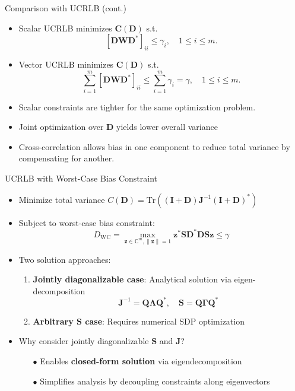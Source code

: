 \documentclass{beamer}
\begin{document}
\begin{frame}{Comparison with UCRLB (cont.)}
\begin{itemize}
    \item Scalar UCRLB minimizes $\mathbf{C}(\mathbf{D})$ s.t. 
    \[[\mathbf{D}\mathbf{W}\mathbf{D}^*]_{ii} \leq \gamma_i, \quad 1 \leq i \leq m.\]
    \item Vector UCRLB minimizes $\mathbf{C}(\mathbf{D})$ s.t. 
    \[\sum_{i=1}^m[\mathbf{D}\mathbf{W}\mathbf{D}^*]_{ii} \leq \sum_{i=1}^m\gamma_i = \gamma, 
    \quad 1 \leq i \leq m.\]
    \item Scalar constraints are tighter for the same optimization problem.
    \item Joint optimization over \( \mathbf{D} \) yields lower overall variance
    \item Cross-correlation allows bias in one component to reduce total variance by compensating for another.
\end{itemize}
\end{frame}

\begin{frame}{UCRLB with Worst-Case Bias Constraint}
\begin{itemize}
\item Minimize total variance $C(\mathbf{D}) = \text{Tr}((\mathbf{I}+\mathbf{D})\mathbf{J}^{-1}(\mathbf{I}+\mathbf{D})^*)$
\item Subject to worst-case bias constraint:
\[ D_{\text{WC}} = \max_{\mathbf{z}\in\mathbb{C}^m,\|\mathbf{z}\|=1} \mathbf{z}^*\mathbf{S}\mathbf{D}^*\mathbf{D}\mathbf{S}\mathbf{z} \leq \gamma \]

\item Two solution approaches:
\begin{enumerate}
\item \textbf{Jointly diagonalizable case}: Analytical solution via eigen-decomposition
\[ \mathbf{J}^{-1} = \mathbf{Q}\mathbf{\Lambda}\mathbf{Q}^*, \quad \mathbf{S} = \mathbf{Q}\mathbf{\Gamma}\mathbf{Q}^* \]
\item \textbf{Arbitrary $\mathbf{S}$ case}: Requires numerical SDP optimization
\end{enumerate}

\item Why consider jointly diagonalizable $\mathbf{S}$ and $\mathbf{J}$?
\pause
\begin{itemize}
\item[$\bullet$] Enables \textbf{closed-form solution} via eigendecomposition
\item[$\bullet$] Simplifies analysis by decoupling constraints along eigenvectors
\end{itemize}
\end{itemize}

\end{frame}
\end{document}
